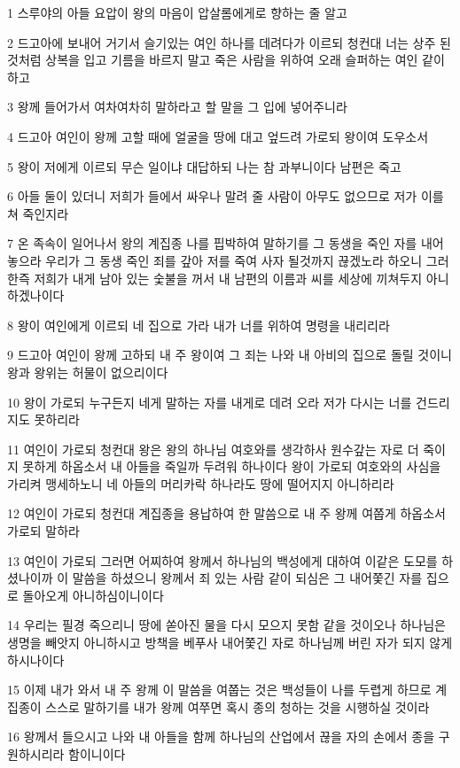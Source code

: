 \par 1 스루야의 아들 요압이 왕의 마음이 압살롬에게로 향하는 줄 알고
\par 2 드고아에 보내어 거기서 슬기있는 여인 하나를 데려다가 이르되 청컨대 너는 상주 된 것처럼 상복을 입고 기름을 바르지 말고 죽은 사람을 위하여 오래 슬퍼하는 여인 같이 하고
\par 3 왕께 들어가서 여차여차히 말하라고 할 말을 그 입에 넣어주니라
\par 4 드고아 여인이 왕께 고할 때에 얼굴을 땅에 대고 엎드려 가로되 왕이여 도우소서
\par 5 왕이 저에게 이르되 무슨 일이냐 대답하되 나는 참 과부니이다 남편은 죽고
\par 6 아들 둘이 있더니 저희가 들에서 싸우나 말려 줄 사람이 아무도 없으므로 저가 이를 쳐 죽인지라
\par 7 온 족속이 일어나서 왕의 계집종 나를 핍박하여 말하기를 그 동생을 죽인 자를 내어 놓으라 우리가 그 동생 죽인 죄를 갚아 저를 죽여 사자 될것까지 끊겠노라 하오니 그러한즉 저희가 내게 남아 있는 숯불을 꺼서 내 남편의 이름과 씨를 세상에 끼쳐두지 아니하겠나이다
\par 8 왕이 여인에게 이르되 네 집으로 가라 내가 너를 위하여 명령을 내리리라
\par 9 드고아 여인이 왕께 고하되 내 주 왕이여 그 죄는 나와 내 아비의 집으로 돌릴 것이니 왕과 왕위는 허물이 없으리이다
\par 10 왕이 가로되 누구든지 네게 말하는 자를 내게로 데려 오라 저가 다시는 너를 건드리지도 못하리라
\par 11 여인이 가로되 청컨대 왕은 왕의 하나님 여호와를 생각하사 원수갚는 자로 더 죽이지 못하게 하옵소서 내 아들을 죽일까 두려워 하나이다 왕이 가로되 여호와의 사심을 가리켜 맹세하노니 네 아들의 머리카락 하나라도 땅에 떨어지지 아니하리라
\par 12 여인이 가로되 청컨대 계집종을 용납하여 한 말씀으로 내 주 왕께 여쭙게 하옵소서 가로되 말하라
\par 13 여인이 가로되 그러면 어찌하여 왕께서 하나님의 백성에게 대하여 이같은 도모를 하셨나이까 이 말씀을 하셨으니 왕께서 죄 있는 사람 같이 되심은 그 내어쫓긴 자를 집으로 돌아오게 아니하심이니이다
\par 14 우리는 필경 죽으리니 땅에 쏟아진 물을 다시 모으지 못함 같을 것이오나 하나님은 생명을 빼앗지 아니하시고 방책을 베푸사 내어쫓긴 자로 하나님께 버린 자가 되지 않게 하시나이다
\par 15 이제 내가 와서 내 주 왕께 이 말씀을 여쭙는 것은 백성들이 나를 두렵게 하므로 계집종이 스스로 말하기를 내가 왕께 여쭈면 혹시 종의 청하는 것을 시행하실 것이라
\par 16 왕께서 들으시고 나와 내 아들을 함께 하나님의 산업에서 끊을 자의 손에서 종을 구원하시리라 함이니이다
